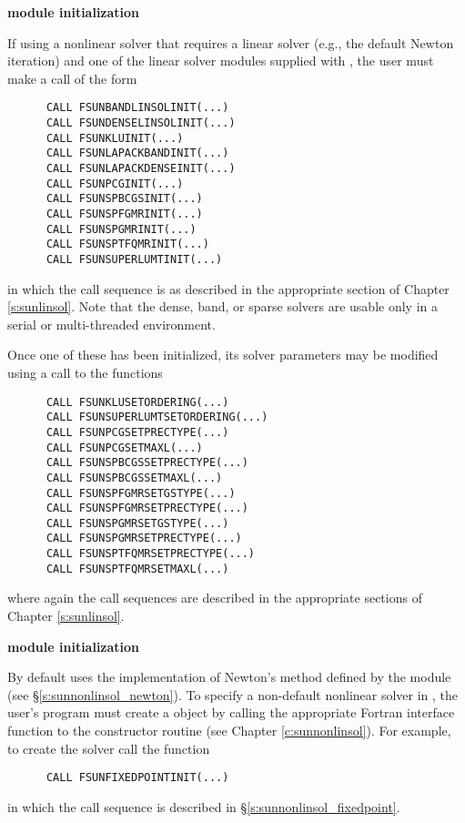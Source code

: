 \begin{Steps}
\item\label{i:fcv_linsol_init} {\bf {\sunlinsol} module initialization}

  If using a nonlinear solver that requires a linear solver (e.g., the default
  Newton iteration) and one of the {\sunlinsol} linear solver modules supplied
  with {\sundials}, the user must make a call of the form
\begin{verbatim}
      CALL FSUNBANDLINSOLINIT(...)
      CALL FSUNDENSELINSOLINIT(...)
      CALL FSUNKLUINIT(...)
      CALL FSUNLAPACKBANDINIT(...)
      CALL FSUNLAPACKDENSEINIT(...)
      CALL FSUNPCGINIT(...)
      CALL FSUNSPBCGSINIT(...)
      CALL FSUNSPFGMRINIT(...)
      CALL FSUNSPGMRINIT(...)
      CALL FSUNSPTFQMRINIT(...)
      CALL FSUNSUPERLUMTINIT(...)
\end{verbatim}
in which the call sequence is as described in the appropriate
section of Chapter \ref{s:sunlinsol}.  Note that the dense, band, or
sparse solvers are usable only in a serial or multi-threaded
environment.

Once one of these has been initialized, its solver parameters may be
modified using a call to the functions
\begin{verbatim}
      CALL FSUNKLUSETORDERING(...)
      CALL FSUNSUPERLUMTSETORDERING(...)
      CALL FSUNPCGSETPRECTYPE(...)
      CALL FSUNPCGSETMAXL(...)
      CALL FSUNSPBCGSSETPRECTYPE(...)
      CALL FSUNSPBCGSSETMAXL(...)
      CALL FSUNSPFGMRSETGSTYPE(...)
      CALL FSUNSPFGMRSETPRECTYPE(...)
      CALL FSUNSPGMRSETGSTYPE(...)
      CALL FSUNSPGMRSETPRECTYPE(...)
      CALL FSUNSPTFQMRSETPRECTYPE(...)
      CALL FSUNSPTFQMRSETMAXL(...)
\end{verbatim}
where again the call sequences are described in the appropriate
sections of Chapter \ref{s:sunlinsol}.

\item\label{i:fcv_nonlinsol_init} {\bf {\sunnonlinsol} module initialization}

  By default {\cvode} uses the {\sunnonlinsol} implementation of Newton's method
  defined by the {\sunnonlinsolnewton} module (see \S\ref{s:sunnonlinsol_newton}).
  To specify a non-default nonlinear solver in {\cvode}, the user's program must
  create a {\sunnonlinsol} object by calling the appropriate Fortran interface
  function to the constructor routine (see Chapter \ref{c:sunnonlinsol}). For
  example, to create the {\sunnonlinsolfixedpoint} solver call the function
\begin{verbatim}
      CALL FSUNFIXEDPOINTINIT(...)
\end{verbatim}
  in which the call sequence is described in \S\ref{s:sunnonlinsol_fixedpoint}.


\end{Steps}
